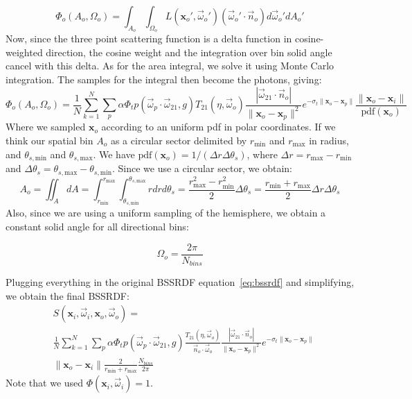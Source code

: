 \documentclass[10pt,a4paper]{article}
\newcommand{\x}{\mathbf{x}}
\newcommand{\vomega}{\vec{\omega}}
\begin{document}
$$
\Phi_o(A_o, \Omega_o) = \int_{A_o} \int_{\Omega_o} L(\x_o', \vomega_o') (\vomega_o' \cdot \vec{n}_o) d\vomega_o' dA_o'
$$
Now, since the three point scattering function is a delta function in cosine-weighted direction, the cosine weight and the integration over bin solid angle cancel with this delta. As for the area integral, we solve it using Monte Carlo integration. The samples for the integral then become the photons, giving:
$$
\Phi_o(A_o, \Omega_o) = \frac{1}{N} \sum_{k=1}^N\sum_p \alpha \Phi_t p(\vomega_p \cdot \vomega_{21}, g) T_{21}(\eta, \vomega_o)  \frac{|\vomega_{21}\cdot\vec{n}_o |}{\|\x_o - \x_p\|^2}  e^{-\sigma_t \|\x_o - \x_p\|} \frac{\|\x_o - \x_i\|}{\text{pdf}(\x_o)}
$$
Where we sampled $\x_o$ according to an uniform pdf in polar coordinates. If we think our spatial bin $A_o$ as a circular sector delimited by $r_\text{min}$ and $r_\text{max}$ in radius, and $\theta_{s,\text{min}}$ and $\theta_{s,\text{max}}$. We have $\text{pdf}(\x_o) = 1/(\Delta r \Delta \theta_{s})$, where $\Delta r =  r_\text{max} - r_\text{min}$ and $\Delta \theta_{s} = \theta_{s,\text{max}} - \theta_{s,\text{min}}$.  Since we use a circular sector, we obtain:
$$
A_o = \iint_A dA = \int_{r_\text{min}}^{r_\text{max}}\int_{\theta_{s,\text{min}}}^{\theta_{s,\text{max}}} r dr d\theta_s =  \frac{r_\text{max}^2 - r_\text{min}^2}{2}  \Delta \theta_{s} = \frac{r_\text{min} + r_\text{max}}{2}  \Delta r \Delta \theta_{s}
$$
Also, since we are using a uniform sampling of the hemisphere, we obtain a constant solid angle for all directional bins:

\begin{equation*}
\Omega_o = \frac{2\pi} {N_{bins}}
\end{equation*}

Plugging everything in the original BSSRDF equation~\ref{eq:bssrdf} and simplifying, we obtain the final BSSRDF:
\begin{equation*}
\begin{split}
&S(\x_i, \vomega_i, \x_o, \vomega_o) = \\ &\frac{1}{N} \sum_{k=1}^N\sum_p \alpha \Phi_t p(\vomega_p \cdot \vomega_{21}, g)  \frac{ T_{21}(\eta, \vomega_o)}{\vec{n}_o \cdot \vomega_o}  \frac{|\vomega_{21}\cdot\vec{n}_o |}{\|\x_o - \x_p\|^2}  e^{-\sigma_t \|\x_o - \x_p\|} \\& {\|\x_o - \x_i\|} \frac{2}{r_\text{min} + r_\text{max}} \frac{N_{bins}}{2\pi} 
\end{split}
\end{equation*}
Note that we used $\Phi(\x_i, \vomega_i) = 1$.




\end{document}
